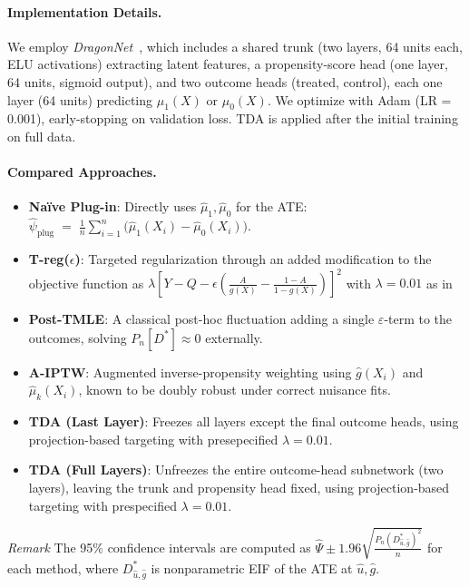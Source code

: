 \documentclass{article}
\theoremstyle{remark}
\begin{document}
\paragraph{Implementation Details.}
We employ \emph{DragonNet}~\cite{shi2019adapting}, which includes a shared trunk (two layers, 64 units each, ELU activations) extracting latent features, a propensity-score head (one layer, 64 units, sigmoid output), and two outcome heads (treated, control), each one layer (64 units) predicting $\mu_1(X)$ or $\mu_0(X)$. We optimize with Adam (LR = 0.001), early-stopping on validation loss. TDA is applied after the initial training on full data. 

\paragraph{Compared Approaches.}
\begin{itemize}[leftmargin=1.5em]
    \item \textbf{Naïve Plug-in}: Directly uses $\hat{\mu}_1, \hat{\mu}_0$ for the ATE: 
    $
      \hat{\psi}_{\mathrm{plug}} 
      \;=\; \frac{1}{n}\!\sum_{i=1}^{n}\bigl(\hat{\mu}_1(X_i)-\hat{\mu}_0(X_i)\bigr).
    $
    \item \textbf{T-reg($\epsilon$)}: Targeted regularization through an added modification to the objective function as $\lambda[Y-Q-\epsilon(\frac{A}{g(X)}-\frac{1-A}{1-g(X)})]^2$ with $\lambda=0.01$ as in \cite{shi2019adapting}
    \item \textbf{Post-TMLE}: A classical post-hoc fluctuation adding a single $\varepsilon$-term to the outcomes, solving $P_n[D^*] \approx 0$ externally.
    \item \textbf{A-IPTW}: Augmented inverse-propensity weighting using $\hat{g}(X_i)$ and $\hat{\mu}_k(X_i)$, known to be doubly robust under correct nuisance fits.
    \item \textbf{TDA (Last Layer)}: Freezes all layers except the final outcome heads, using projection-based targeting with presepecified $\lambda=0.01$.
    \item \textbf{TDA (Full Layers)}: Unfreezes the entire outcome-head subnetwork (two layers), leaving the trunk and propensity head fixed, using projection-based targeting with prespecified $\lambda=0.01$.
\end{itemize}

\emph{Remark} The 95\% confidence intervals are computed as $\hat{\Psi}\pm 1.96 \sqrt{\frac{P_n(D^*_{\hat{u},\hat{g}})^2}{n}}$ for each method, where $D^*_{\hat{u},\hat{g}}$ is nonparametric EIF of the ATE at $\hat{u},\hat{g}$.
\end{document}
